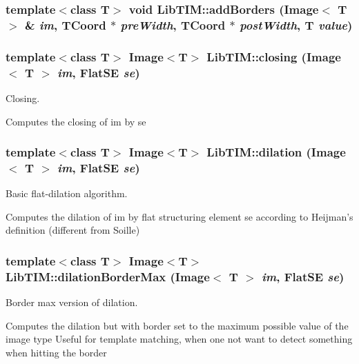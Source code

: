 \subsubsection{\setlength{\rightskip}{0pt plus 5cm}template$<$class T$>$ void Lib\-TIM::add\-Borders (Image$<$ T $>$ \& {\em im}, {\bf TCoord} $\ast$ {\em pre\-Width}, {\bf TCoord} $\ast$ {\em post\-Width}, T {\em value})}\label{group__basisFunctions_ga0}


\subsubsection{\setlength{\rightskip}{0pt plus 5cm}template$<$class T$>$ Image$<$T$>$ Lib\-TIM::closing (Image$<$ T $>$ {\em im}, Flat\-SE {\em se})}\label{group__basisFunctions_ga7}


Closing. 

Computes the closing of im by se
\subsubsection{\setlength{\rightskip}{0pt plus 5cm}template$<$class T$>$ Image$<$T$>$ Lib\-TIM::dilation (Image$<$ T $>$ {\em im}, Flat\-SE {\em se})}\label{group__basisFunctions_ga2}


Basic flat-dilation algorithm. 

Computes the dilation of im by flat structuring element se according to Heijman's definition (different from Soille)
\subsubsection{\setlength{\rightskip}{0pt plus 5cm}template$<$class T$>$ Image$<$T$>$ Lib\-TIM::dilation\-Border\-Max (Image$<$ T $>$ {\em im}, Flat\-SE {\em se})}\label{group__basisFunctions_ga4}


Border max version of dilation. 

Computes the dilation but with border set to the maximum possible value of the image type Useful for template matching, when one not want to detect something when hitting the border
